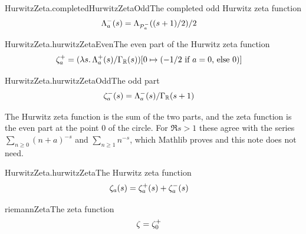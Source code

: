 \documentclass{article}
\begin{document}
\begin{leandefinition}[def, sum=IBIj6vWMqq]{HurwitzZeta.completedHurwitzZetaOdd}{The completed odd Hurwitz zeta function}
\label{def:HurwitzZeta.completedHurwitzZetaOdd}
\[\LeanMath{\begin{aligned}\Lambda^{-}_{a}(s) &= \Lambda_{\mathcal{P}^{-}_{a}}((s + 1) / 2) / 2\end{aligned}}\]
\end{leandefinition}

\begin{leandefinition}[def, sum=gdpdhk82ca]{HurwitzZeta.hurwitzZetaEven}{The even part of the Hurwitz zeta function}
\label{def:HurwitzZeta.hurwitzZetaEven}
\[\LeanMath{\begin{aligned}\zeta^{+}_{a} &= (\lambda s.\,\Lambda^{+}_{a}(s) / \Gamma_{\mathbb{R}}(s))[0 \mapsto (-1 / 2 \text{ if } a = 0\text{, else } 0)]\end{aligned}}\]
\end{leandefinition}

\begin{leandefinition}[def, sum=muXCfnbA1Z]{HurwitzZeta.hurwitzZetaOdd}{The odd part}
\label{def:HurwitzZeta.hurwitzZetaOdd}
\[\LeanMath{\begin{aligned}\zeta^{-}_{a}(s) &= \Lambda^{-}_{a}(s) / \Gamma_{\mathbb{R}}(s + 1)\end{aligned}}\]
\end{leandefinition}

The Hurwitz zeta function is the sum of the two parts, and the zeta
function is the even part at the point $0$ of the circle. For
$\Re s > 1$ these agree with the series $\sum_{n \ge 0} (n + a)^{-s}$ and
$\sum_{n \ge 1} n^{-s}$, which Mathlib proves and this note does not need.

\begin{leandefinition}[def, sum=Ewg0DTIMEo]{HurwitzZeta.hurwitzZeta}{The Hurwitz zeta function}
\label{def:HurwitzZeta.hurwitzZeta}
\[\LeanMath{\begin{aligned}\zeta_{a}(s) &= \zeta^{+}_{a}(s) + \zeta^{-}_{a}(s)\end{aligned}}\]
\end{leandefinition}

\begin{leandefinition}[def, sum=ObuDf-hTEK]{riemannZeta}{The zeta function}
\label{def:riemannZeta}
\[\LeanMath{\begin{aligned}\zeta &= \zeta^{+}_{0}\end{aligned}}\]
\end{leandefinition}
\end{document}
